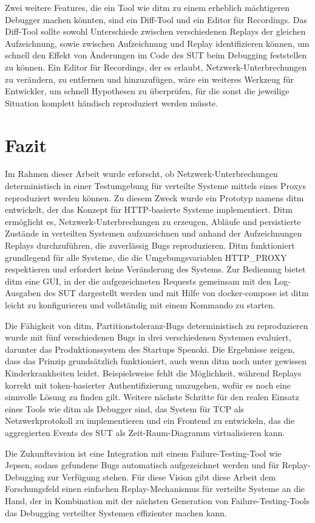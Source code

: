 \documentclass[12pt,a4paper]{report}
\begin{document}
Zwei weitere Features, die ein Tool wie ditm zu einem erheblich mächtigeren Debugger machen könnten, sind ein Diff-Tool und ein
Editor für Recordings. Das Diff-Tool sollte sowohl Unterschiede zwischen verschiedenen Replays der gleichen Aufzeichnung, sowie
zwischen Aufzeichnung und Replay identifizieren können, um schnell den Effekt von Änderungen im Code des SUT beim Debugging
feststellen zu können. Ein Editor für Recordings, der es erlaubt, Netzwerk-Unterbrechungen zu verändern, zu entfernen und
hinzuzufügen, wäre ein weiteres Werkzeug für Entwickler, um schnell Hypothesen zu überprüfen, für die sonst die jeweilige
Situation komplett händisch reproduziert werden müsste.



\chapter{Fazit}
Im Rahmen dieser Arbeit wurde erforscht, ob Netzwerk-Unterbrechungen deterministisch in einer Testumgebung für verteilte Systeme
mittels eines Proxys reproduziert werden können. Zu diesem Zweck wurde ein Prototyp namens ditm entwickelt, der das Konzept für
HTTP-basierte Systeme implementiert. Ditm ermöglicht es, Netzwerk-Unterbrechungen zu erzeugen, Abläufe und persistierte Zustände
in verteilten Systemen aufzuzeichnen und anhand der Aufzeichnungen Replays durchzuführen, die zuverlässig Bugs reproduzieren. Ditm
funktioniert grundlegend für alle Systeme, die die Umgebungsvariablen HTTP\_PROXY respektieren und erfordert keine Veränderung des
Systems. Zur Bedienung bietet ditm eine GUI, in der die aufgezeichneten Requests gemeinsam mit den Log-Ausgaben des SUT
dargestellt werden und mit Hilfe von docker-compose ist ditm leicht zu konfigurieren und vollständig mit einem Kommando zu starten.

Die Fähigkeit von ditm, Partitionstoleranz-Bugs deterministisch zu reproduzieren wurde mit fünf verschiedenen Bugs in drei verschiedenen Systemen
evaluiert, darunter das Produktionssystem des Startups Spenoki. Die Ergebnisse zeigen, dass das Prinzip grundsätzlich funktioniert, auch wenn
ditm noch unter gewissen Kinderkrankheiten leidet. Beispielsweise fehlt die Möglichkeit, während Replays korrekt mit token-basierter
Authentifizierung umzugehen, wofür es noch eine sinnvolle Lösung zu finden gilt. Weitere nächste Schritte für den realen Einsatz
eines Tools wie ditm als Debugger sind, das System für TCP als Netzwerkprotokoll zu implementieren und ein Frontend zu entwickeln,
das die aggregierten Events des SUT als Zeit-Raum-Diagramm virtualisieren kann.

Die Zukunftsvision ist eine Integration mit einem Failure-Testing-Tool wie Jepsen, sodass gefundene Bugs automatisch aufgezeichnet
werden und für Replay-Debugging zur Verfügung stehen. Für diese Vision gibt diese Arbeit dem Forschungsfeld einen einfachen
Replay-Mechanismus für verteilte Systeme an die Hand, der in Kombination mit der nächsten Generation von Failure-Testing-Tools das
Debugging verteilter Systemen effizienter machen kann.

\printbibliography

\setlength{\parskip}{0em}
\listoffigures
\listoftables
\lstlistoflistings
\end{document}
